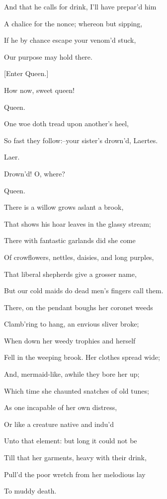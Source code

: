 \documentclass[12pt]{book}
\begin{document}
And that he calls for drink, I'll have prepar'd him

A chalice for the nonce; whereon but sipping,

If he by chance escape your venom'd stuck,

Our purpose may hold there.



[Enter Queen.]



How now, sweet queen!



Queen.

One woe doth tread upon another's heel,

So fast they follow:--your sister's drown'd, Laertes.



Laer.

Drown'd! O, where?



Queen.

There is a willow grows aslant a brook,

That shows his hoar leaves in the glassy stream;

There with fantastic garlands did she come

Of crowflowers, nettles, daisies, and long purples,

That liberal shepherds give a grosser name,

But our cold maids do dead men's fingers call them.

There, on the pendant boughs her coronet weeds

Clamb'ring to hang, an envious sliver broke;

When down her weedy trophies and herself

Fell in the weeping brook. Her clothes spread wide;

And, mermaid-like, awhile they bore her up;

Which time she chaunted snatches of old tunes;

As one incapable of her own distress,

Or like a creature native and indu'd

Unto that element: but long it could not be

Till that her garments, heavy with their drink,

Pull'd the poor wretch from her melodious lay

To muddy death.
\end{document}
